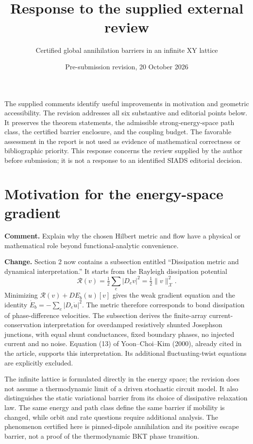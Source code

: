 \documentclass[10pt]{article}
\title{Response to the supplied external review}
\author{Certified global annihilation barriers in an infinite XY lattice}
\date{Pre-submission revision, 20 October 2026}
\newcommand{\X}{\mathcal X}
\newcommand{\nrm}[1]{\lVert#1\rVert}
\begin{document}
\maketitle

The supplied comments identify useful improvements in motivation and
geometric accessibility. The revision addresses all six substantive and
editorial points below. It preserves the theorem statements, the
admissible strong-energy-space path class, the certified barrier
enclosure, and the coupling budget. The favorable assessment in the
report is not used as evidence of mathematical correctness or
bibliographic priority. This response concerns the review supplied by
the author before submission; it is not a response to an identified
SIADS editorial decision.

\section{Motivation for the energy-space gradient}

\textbf{Comment.} Explain why the chosen Hilbert metric and flow have a
physical or mathematical role beyond functional-analytic convenience.

\textbf{Change.} Section 2 now contains a subsection entitled
``Dissipation metric and dynamical interpretation.'' It starts from the
Rayleigh dissipation potential
\[
 \mathcal R(v)=\tfrac12\sum_e|D_ev|^2=\tfrac12\nrm v_\X^2.
\]
Minimizing $\mathcal R(v)+DE_b(u)[v]$ gives the weak gradient equation
and the identity $\dot E_b=-\sum_e|D_e\dot u|^2$. The metric therefore
corresponds to bond dissipation of phase-difference velocities. The
subsection derives the finite-array current-conservation interpretation
for overdamped resistively shunted Josephson junctions, with equal shunt
conductances, fixed boundary phases, no injected current and no noise.
Equation (13) of Yoon--Choi--Kim (2000), already cited in the article,
supports this interpretation. Its additional fluctuating-twist
equations are explicitly excluded.

The infinite lattice is formulated directly in the energy space; the
revision does not assume a thermodynamic limit of a driven stochastic
circuit model. It also distinguishes the static variational barrier
from its choice of dissipative relaxation law. The same energy and path
class define the same barrier if mobility is changed, while orbit and
rate questions require additional analysis. The phenomenon certified
here is pinned-dipole annihilation and its positive escape barrier,
not a proof of the thermodynamic BKT phase transition.
\end{document}
